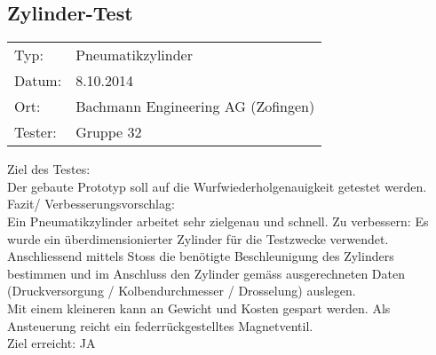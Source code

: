 \subsection{Zylinder-Test}
\begin{tabular}{p{2cm}p{2cm}}
	Typ: & Pneumatikzylinder \\
	Datum: & 8.10.2014     \\
	Ort: & Bachmann Engineering AG (Zofingen)   \\
	Tester: & Gruppe 32     \\
	
\end{tabular}



Ziel des Testes:   \\
Der gebaute Prototyp soll auf die 
Wurfwiederholgenauigkeit getestet werden. 
Fazit/ Verbesserungsvorschlag: \\
Ein Pneumatikzylinder arbeitet sehr zielgenau und schnell. 
Zu verbessern: 
Es wurde ein überdimensionierter Zylinder für die Testzwecke verwendet.  \\

Anschliessend mittels Stoss die benötigte Beschleunigung des Zylinders 
bestimmen und im Anschluss den Zylinder gemäss ausgerechneten Daten 
(Druckversorgung / Kolbendurchmesser / Drosselung) auslegen. \\

Mit einem kleineren kann an Gewicht und Kosten gespart werden. Als 
Ansteuerung reicht ein federrückgestelltes Magnetventil.  \\
Ziel erreicht:   JA